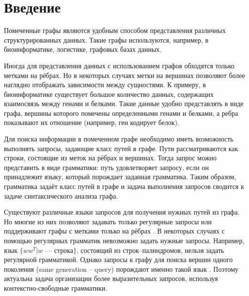\documentclass[14pt]{matmex-diploma}
\begin{document}
\maketitle
\tableofcontents
\section*{Введение}

Помеченные графы являются удобным способом представления различных структурированных данных. Такие графы используются, например, в биоинформатике, логистике, графовых базах данных.

  Иногда для представления данных с использованием графов обходятся только метками на рёбрах. Но в некоторых случаях метки на вершинах позволяют более наглядно отображать зависимости между сущностями. К примеру, в биоинформатике существует большое количество данных, содержащих взаимосвязь между генами и белками. Такие данные удобно представлять в виде графа, вершины которого помечены определенными генами и белками, а ребра показывают их отношение (например, ген кодирует белок).

  Для поиска информации в помеченном графе необходимо иметь возможность выполнять запросы, задающие класс путей в графе. Пути рассматриваются как строки, состоящие из меток на рёбрах и вершинах. Тогда запрос можно представить в виде грамматики: путь удовлетворяет запросу, если он принадлежит языку, который порождает заданная грамматика. Таким образом, грамматика задаёт класс путей в графе и задача выполнения запросов сводится к задаче синтаксического анализа графа.
  
  Существуют различные языки запросов для получения нужных путей из графа. Но многие из них позволяют задавать только регулярные запросы \cite{abiteboul1997regular, prud2008sparql, koschmieder2012regular} или поддерживают графы с метками только на рёбрах \cite{hellings2014conjunctive}. В некоторых случаях с помощью регулярных грамматик невозможно задать нужные запросы. Например, язык $\{w w^T | w$ --- строка$\}$, состоящий из строк--палиндромов, нельзя задать регулярной грамматикой. Однако запросы к графу для поиска вершин одного поколения (same generation -- query) порождают именно такой язык \cite{zhang2016context}. Поэтому актуальна задача организации более выразительных запросов, используя контекстно-свободные грамматики.
\end{document}
